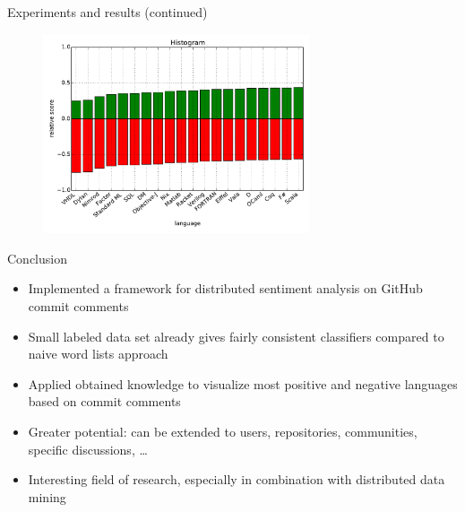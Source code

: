 \documentclass[t,11pt]{beamer}
\begin{document}
\begin{frame}[fragile]{Experiments and results (continued)}
  \begin{figure}
    \centering
    \includegraphics[width=0.7\textwidth]{../plots/all-language-PassiveAggressive-neg.pdf}
  \end{figure}
\end{frame}

\begin{frame}[fragile]{Conclusion}
\begin{itemize}
  \item Implemented a framework for distributed sentiment analysis on GitHub 
    commit comments
  \item Small labeled data set already gives fairly consistent classifiers 
    compared to naive word lists approach
  \item Applied obtained knowledge to visualize most positive and negative 
    languages based on commit comments
  \item Greater potential: can be extended to users, repositories, communities, 
    specific discussions, \ldots
  \item Interesting field of research, especially in combination with 
    distributed data mining
\end{itemize}
\end{frame}
\end{document}
